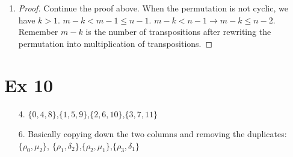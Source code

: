 \documentclass{article}
\begin{document}
\begin{itemize}
\begin{enumerate}[label=\alph*.]
\begin{proof}
      We've written $\tau$ as multiplication of no more than $n-1$
      transpositions. 
    \end{proof}
  \item
    \begin{proof}
      Continue the proof above. When the permutation is not cyclic, we
      have $k >1$. $m - k < m - 1 \leq n -1$. $m - k < n -1
      \rightarrow m - k \leq n -2$. Remember $m-k$ is the number of
      transpositions after rewriting the permutation into
      multiplication of transpositions. 
    \end{proof}
\end{enumerate}

\end{itemize}

\section*{Ex 10}
\begin{itemize}
\item [4.]
  $\{0,4,8\}$,$\{1,5,9\}$,$\{2,6,10\}$,$\{3,7,11\}$
\item [6.]
  Basically copying down the two columns and removing the duplicates:
  $\{\rho_0,\mu_2\}$, $\{\rho_1,\delta_2\}$,$\{\rho_2,\mu_1\}$,$\{\rho_3,\delta_1\}$
\end{itemize}
\end{document}
